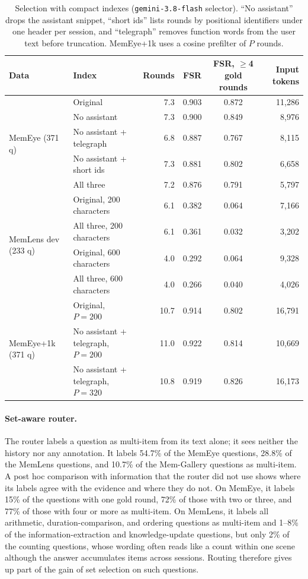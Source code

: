 \begin{table}[h]
\centering
\caption{Selection with compact indexes (\texttt{gemini-3.8-flash} selector). ``No assistant'' drops the assistant snippet, ``short ids'' lists rounds by positional identifiers under one header per session, and ``telegraph'' removes function words from the user text before truncation. MemEye+1k uses a cosine prefilter of $P$ rounds.}
\label{tab:compact}
\small
\begin{tabular}{llrccr}
\toprule
Data & Index & Rounds & FSR & FSR, $\ge$4 gold rounds & Input tokens \\
\midrule
\multirow{5}{*}{MemEye (371 q)} & Original & 7.3 & 0.903 & 0.872 & 11,286 \\
 & No assistant & 7.3 & 0.900 & 0.849 & 8,976 \\
 & No assistant + telegraph & 6.8 & 0.887 & 0.767 & 8,115 \\
 & No assistant + short ids & 7.3 & 0.881 & 0.802 & 6,658 \\
 & All three & 7.2 & 0.876 & 0.791 & 5,797 \\
\midrule
\multirow{4}{*}{MemLens dev (233 q)} & Original, 200 characters & 6.1 & 0.382 & 0.064 & 7,166 \\
 & All three, 200 characters & 6.1 & 0.361 & 0.032 & 3,202 \\
 & Original, 600 characters & 4.0 & 0.292 & 0.064 & 9,328 \\
 & All three, 600 characters & 4.0 & 0.266 & 0.040 & 4,026 \\
\midrule
\multirow{3}{*}{MemEye+1k (371 q)} & Original, $P{=}200$ & 10.7 & 0.914 & 0.802 & 16,791 \\
 & No assistant + telegraph, $P{=}200$ & 11.0 & 0.922 & 0.814 & 10,669 \\
 & No assistant + telegraph, $P{=}320$ & 10.8 & 0.919 & 0.826 & 16,173 \\
\bottomrule
\end{tabular}
\end{table}

\paragraph{Set-aware router.}
\label{app:router}
The router labels a question as multi-item from its text alone; it sees neither the history nor any annotation. It labels 54.7\% of the MemEye questions, 28.8\% of the MemLens questions, and 10.7\% of the Mem-Gallery questions as multi-item. A post hoc comparison with information that the router did not use shows where its labels agree with the evidence and where they do not. On MemEye, it labels 15\% of the questions with one gold round, 72\% of those with two or three, and 77\% of those with four or more as multi-item. On MemLens, it labels all arithmetic, duration-comparison, and ordering questions as multi-item and 1--8\% of the information-extraction and knowledge-update questions, but only 2\% of the counting questions, whose wording often reads like a count within one scene although the answer accumulates items across sessions. Routing therefore gives up part of the gain of set selection on such questions.

